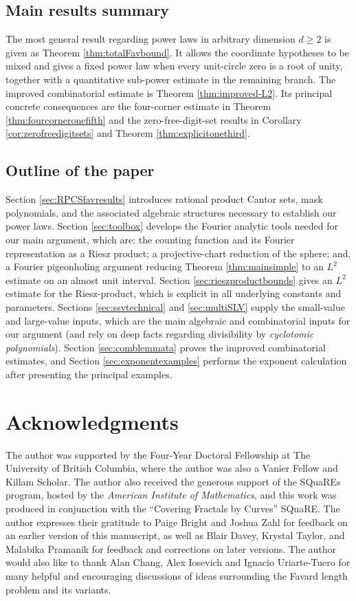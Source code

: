 \documentclass[12pt]{amsart}
\numberwithin{equation}{section}
\begin{document}
\subsection{Main results summary}
The most general result regarding power laws in arbitrary dimension $d \geq 2$ is given as Theorem \ref{thm:totalFavbound}. It allows the coordinate hypotheses to be mixed and gives a fixed power law when every unit-circle zero is a root of unity, together with a quantitative sub-power estimate in the remaining branch.  The improved combinatorial estimate is Theorem \ref{thm:improved-L2}.  Its principal concrete consequences are the four-corner estimate in Theorem \ref{thm:fourcorneronefifth} and the zero-free-digit-set results in Corollary \ref{cor:zerofreedigitsets} and Theorem \ref{thm:explicitonethird}.

\subsection{Outline of the paper}\label{subsec:paperoutline}
Section \ref{sec:RPCSfavresults} introduces rational product Cantor sets, mask polynomials, and the associated algebraic structures necessary to establish our power laws.  Section \ref{sec:toolbox} develops the Fourier analytic tools needed for our main argument, which are: the counting function and its Fourier representation as a Riesz product; a projective-chart reduction of the sphere; and, a Fourier pigeonholing argument reducing Theorem \ref{thm:mainsimple} to an $L^2$ estimate on an almost unit interval.  Section \ref{sec:rieszproductbounds} gives an $L^2$ estimate for the Riesz-product, which is explicit in all underlying constants and parameters.   Sections \ref{sec:ssvtechnical} and \ref{sec:multiSLV} supply the small-value and large-value inputs, which are the main algebraic and combinatorial inputs for our argument (and rely on deep facts regarding divisibility by \textit{cyclotomic polynomials}).  Section \ref{sec:comblemmata} proves the improved combinatorial estimates, and Section \ref{sec:exponentexamples} performs the exponent calculation after presenting the principal examples.

\section*{Acknowledgments}
The author was supported by the Four-Year Doctoral Fellowship at The University of British Columbia, where the author was also a Vanier Fellow and Killam Scholar. The author also received the generous support of the SQuaREs program, hosted by the \textit{American Institute of Mathematics}, and this work was produced in conjunction with the ``Covering Fractals by Curves'' SQuaRE. The author expresses their gratitude to Paige Bright and Joshua Zahl for feedback on an earlier version of this manuscript, as well as Blair Davey, Krystal Taylor, and Malabika Pramanik for feedback and corrections on later versions. The author would also like to thank Alan Chang, Alex Iosevich and Ignacio Uriarte-Tuero for many helpful and encouraging discussions of ideas surrounding the Favard length problem and its variants.
\end{document}
